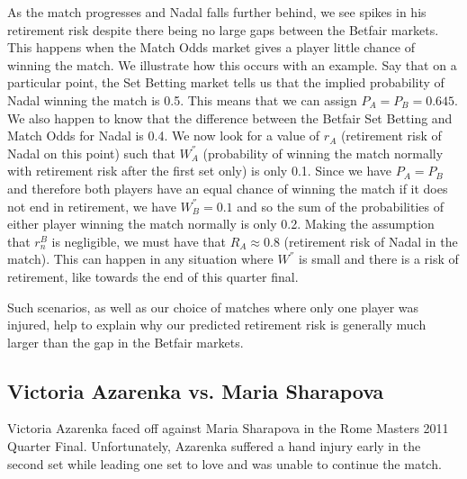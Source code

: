 \documentclass[letterpaper,12pt]{article}
\begin{document}
As the match progresses and Nadal falls further behind, we see spikes in his retirement risk despite there being no large gaps between the Betfair markets.  This happens when the Match Odds market gives a player little chance of winning the match.  We illustrate how this occurs with an example.  Say that on a particular point, the Set Betting market tells us that the implied probability of Nadal winning the match is 0.5.  This means that we can assign $P_A = P_B = 0.645$.  We also happen to know that the difference between the Betfair Set Betting and Match Odds for Nadal is 0.4.  We now look for a value of $r_A$ (retirement risk of Nadal on this point) such that $W_A^{''}$ (probability of winning the match normally with retirement risk after the first set only) is only 0.1.  Since we have $P_A = P_B$ and therefore both players have an equal chance of winning the match if it does not end in retirement, we have $W_B^{''} = 0.1$ and so the sum of the probabilities of either player winning the match normally is only 0.2.  Making the assumption that $r_n^B$ is negligible, we must have that $R_A \approx 0.8$ (retirement risk of Nadal in the match).  This can happen in any situation where $W^{''}$ is small and there is a risk of retirement, like towards the end of this quarter final.

Such scenarios, as well as our choice of matches where only one player was injured, help to explain why our predicted retirement risk is generally much larger than the gap in the Betfair markets.

\subsection{Victoria Azarenka vs. Maria Sharapova}

Victoria Azarenka faced off against Maria Sharapova in the Rome Masters 2011 Quarter Final.  Unfortunately, Azarenka suffered a hand injury early in the second set while leading one set to love and was unable to continue the match.
\end{document}
